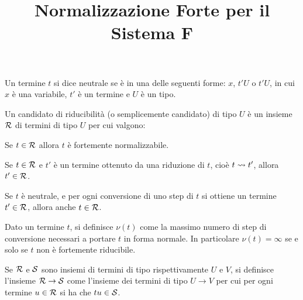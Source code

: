 \documentclass[]{marticle}
\title{\textbf{\huge Normalizzazione Forte per il Sistema F}}
\date{}
\begin{document}
\maketitle

\begin{block}[Definizione]
    Un termine $t$ si dice neutrale se \`e in una delle seguenti forme: $x$,
    $t'U$ o $t'U$, in cui $x$ \`e una variabile, $t'$ \`e un termine e $U$ \`e
    un tipo.
\end{block}

\begin{block}[Definizione]
    Un candidato di riducibilit\`a (o semplicemente candidato) di tipo $U$ \`e
    un insieme $\mathcal{R}$ di termini di tipo $U$ per cui valgono:
    \begin{nlist}[CR1]
        \item Se $t\in\mathcal{R}$ allora $t$ \`e fortemente normalizzabile.
        \item Se $t\in\mathcal{R}$ e $t'$ \`e un termine ottenuto da una riduzione
            di $t$, cio\`e $t\rightsquigarrow t'$, allora $t'\in\mathcal{R}$.
        \item  Se $t$ \`e neutrale, e per ogni conversione di uno step di $t$ si
            ottiene un termine $t'\in\mathcal{R}$, allora anche $t\in\mathcal{R}$.
    \end{nlist}
\end{block}

\begin{block}[Definizione]
    Dato un termine $t$, si definisce $\nu(t)$ come la massimo numero di step
    di conversione necessari a portare $t$ in forma normale. In particolare
    $\nu(t)=\infty$ se e solo se $t$ non \`e fortemente riducibile.
\end{block}

\begin{block}[Definizione]
    Se $\mathcal{R}$ e $\mathcal{S}$ sono insiemi di termini di tipo rispettivamente $U$
    e $V$, si definisce l'insieme $\mathcal{R}\rightarrow\mathcal{S}$ come l'insieme dei
    termini di tipo $U\rightarrow V$ per cui per ogni termine $u\in\mathcal{R}$ si
    ha che $tu\in\mathcal{S}$.
\end{block}
\end{document}
